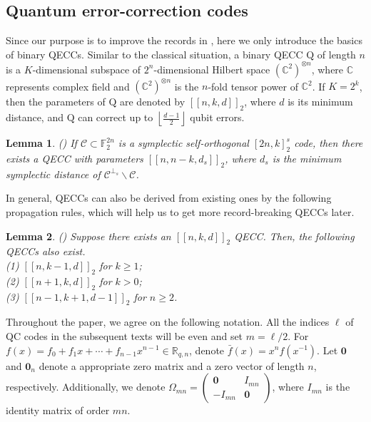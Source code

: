 \documentclass[journal]{IEEEtran}
\newtheorem{lemma}{Lemma}
\newenvironment{note}{{\it Note:}}{}
\begin{document}
\subsection{Quantum error-correction codes}
Since our purpose is to improve the records in \cite{Grassltable}, here we only introduce the basics of binary QECCs. 
Similar to the classical situation, a binary QECC $\mathrm{Q}$ of length $n$ is a $K$-dimensional subspace of $2^n$-dimensional Hilbert space $(\mathbb{C}^{2})^{\otimes n}$, where $\mathbb{C}$ represents complex field and $(\mathbb{C}^{2})^{\otimes n}$ is the $n$-fold tensor power of $\mathbb{C}^2$. If $K = 2^k$, then the parameters of $\mathrm{Q}$ are denoted by $\left[\left[n, k, d\right]\right]_2$, where $d$ is its minimum distance, and $\mathrm{Q}$ can correct up to $\left\lfloor\frac{d-1}{2}\right\rfloor$ qubit errors. 
\begin{lemma}\label{CRSS}(\cite{calderbank1998quantum}) If $\mathscr{C} \subset \mathbb{F}_{2}^{2 n}$ is a symplectic self-orthogonal $\left[2n, k\right]^s_2$ code, then there exists a QECC with parameters $\left[\left[n, n-k, d_s\right]\right]_{2}$, where $d_s$ is the minimum symplectic distance of $\mathscr{C}^{\perp_{s}} \backslash\mathscr{C}$.
\end{lemma}

In general, QECCs can also be derived from existing ones by the following propagation rules, which will help us to get more record-breaking QECCs later.

\begin{lemma}\label{propagation_rules}
	(\cite{calderbank1998quantum}) Suppose there exists an $\left[\left[n, k, d\right]\right]_{2}$ QECC. Then, the following QECCs also exist.\\
	(1) $\left[\left[n, k-1, d\right]\right]_{2}$ for $k\ge 1$;\\
	(2) $\left[\left[n+1, k, d\right]\right]_{2}$ for $k>0$;\\
	(3) $\left[\left[n-1, k+1, d-1\right]\right]_{2}$ for $n\ge2$.
\end{lemma}

\begin{note}
Throughout the paper, we agree on the following notation.
All the indices $\ell$ of QC codes in the subsequent texts will be even and set $m=\ell/ 2$.
For $f(x)=f_{0}+f_{1} x+\cdots+ f_{n-1} x^{n-1} \in \mathbb{R}_{q,n}$, denote $\bar{f}(x)=x^{n}f(x^{-1})$. 
Let $\mathbf{0}$ and $\mathbf{0}_n$ denote a appropriate zero matrix and a zero vector of length $n$, respectively.
Additionally, we denote 
$\Omega _{mn}=\left(\begin{array}{cc}
	\mathbf{0} & I_{m n} \\
	-I_{m n} & \mathbf{0}
\end{array}\right)$, where $I_{mn}$ is the identity matrix of order $mn$. 
\end{note}
\end{document}
